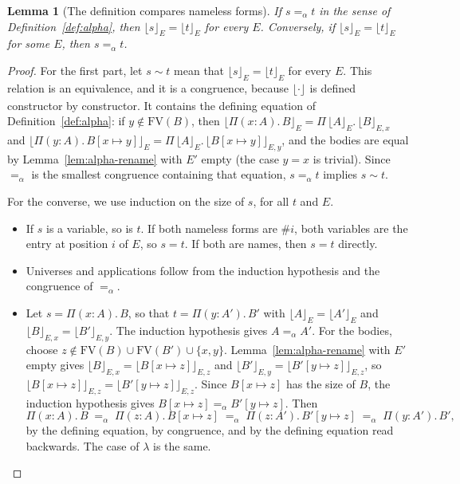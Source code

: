 \documentclass[acmsmall,screen,nonacm]{acmart}
\newtheorem{lemma}[theorem]{Lemma}
\newcommand{\tPi}[3]{\Pi(#1{:}#2).\,#3}
\newcommand{\subst}[3]{#1[#2 \mapsto #3]}
\newcommand{\FV}{\mathrm{FV}}
\newcommand{\alphaeq}{=_{\alpha}}
\newcommand{\db}[2]{\lfloor #1 \rfloor_{#2}}
\begin{document}
\begin{lemma}[The definition compares nameless forms]
\label{lem:alpha-def}
If $s \alphaeq t$ in the sense of Definition~\ref{def:alpha}, then $\db{s}{E} = \db{t}{E}$ for every $E$.
Conversely, if $\db{s}{E} = \db{t}{E}$ for some $E$, then $s \alphaeq t$.
\end{lemma}

\begin{proof}
For the first part, let $s \sim t$ mean that $\db{s}{E} = \db{t}{E}$ for every $E$.
This relation is an equivalence, and it is a congruence, because $\db{\cdot}{}$ is defined constructor by constructor.
It contains the defining equation of Definition~\ref{def:alpha}:
if $y \notin \FV(B)$, then $\db{\tPi{x}{A}{B}}{E} = \Pi\,\db{A}{E}.\,\db{B}{E, x}$ and $\db{\tPi{y}{A}{\subst{B}{x}{y}}}{E} = \Pi\,\db{A}{E}.\,\db{\subst{B}{x}{y}}{E, y}$,
and the bodies are equal by Lemma~\ref{lem:alpha-rename} with $E'$ empty (the case $y = x$ is trivial).
Since $\alphaeq$ is the smallest congruence containing that equation, $s \alphaeq t$ implies $s \sim t$.

For the converse, we use induction on the size of $s$, for all $t$ and $E$.
\begin{itemize}
  \item If $s$ is a variable, so is $t$.
    If both nameless forms are $\#i$, both variables are the entry at position $i$ of $E$, so $s = t$.
    If both are names, then $s = t$ directly.
  \item Universes and applications follow from the induction hypothesis and the congruence of $\alphaeq$.
  \item Let $s = \tPi{x}{A}{B}$, so that $t = \tPi{y}{A'}{B'}$ with $\db{A}{E} = \db{A'}{E}$ and $\db{B}{E, x} = \db{B'}{E, y}$.
    The induction hypothesis gives $A \alphaeq A'$.
    For the bodies, choose $z \notin \FV(B) \cup \FV(B') \cup \{x, y\}$.
    Lemma~\ref{lem:alpha-rename} with $E'$ empty gives $\db{B}{E, x} = \db{\subst{B}{x}{z}}{E, z}$ and $\db{B'}{E, y} = \db{\subst{B'}{y}{z}}{E, z}$,
    so $\db{\subst{B}{x}{z}}{E, z} = \db{\subst{B'}{y}{z}}{E, z}$.
    Since $\subst{B}{x}{z}$ has the size of $B$, the induction hypothesis gives $\subst{B}{x}{z} \alphaeq \subst{B'}{y}{z}$.
    Then
    \[
    \tPi{x}{A}{B} \;\alphaeq\; \tPi{z}{A}{\subst{B}{x}{z}} \;\alphaeq\; \tPi{z}{A'}{\subst{B'}{y}{z}} \;\alphaeq\; \tPi{y}{A'}{B'},
    \]
    by the defining equation, by congruence, and by the defining equation read backwards.
    The case of $\lambda$ is the same. \qedhere
\end{itemize}
\end{proof}
\end{document}
